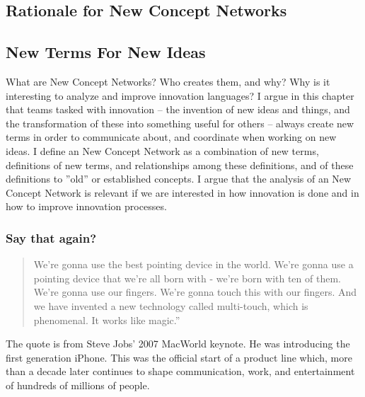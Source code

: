 \documentclass[graybox,envcountchap,sectrefs]{svmono}
\newcommand{\ncnf}{New Concept Network}
\begin{document}
\printbibliography



\begin{partbacktext}
\part{Rationale for \ncnf s}
\label{pt-2}
\end{partbacktext}

\chapter{New Terms For New Ideas}
\label{c:new-terms-for-new-ideas}

What are \ncnf s? Who creates them, and why? Why is it interesting to analyze and improve innovation languages? I argue in this chapter that teams tasked with innovation -- the invention of new ideas and things, and the transformation of these into something useful for others -- always create new terms in order to communicate about, and coordinate when working on new ideas. I define an \ncnf{} as a combination of new terms, definitions of new terms, and relationships among these definitions, and of these definitions to ''old'' or established concepts. I argue that the analysis of an \ncnf{} is relevant if we are interested in how innovation is done and in how to improve innovation processes.

\section{Say that again?}
\label{c1:s1}
\begin{quote}
We're gonna use the best pointing device in the world. We're gonna use a pointing device that we're all born with - we're born with ten of them. We're gonna use our fingers.
We're gonna touch this with our fingers. And we have invented a new technology called multi-touch, which is phenomenal. It works like magic.'' \cite{Wright2015a}
\end{quote}

The quote is from Steve Jobs' 2007 MacWorld keynote. He was introducing the first generation iPhone. This was the official start of a product line which, more than a decade later continues to shape communication, work, and entertainment of hundreds of millions of people. 
\end{document}
